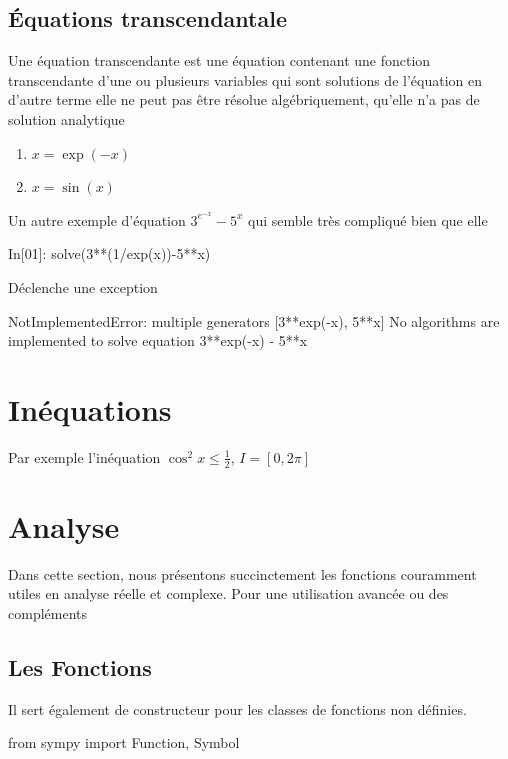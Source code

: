 \subsection{Équations transcendantale}
\begin{definition}
Une équation transcendante est une équation contenant une fonction transcendante d'une ou plusieurs variables 
qui sont solutions de l'équation en d'autre terme elle ne peut pas être résolue algébriquement, qu'elle n'a pas 
de solution analytique
\end{definition}
\begin{example}
 \begin{enumerate}
  \item $x = \exp(-x)$
  \item $x = \sin(x)$
 \end{enumerate}
\end{example}

Un autre exemple d'équation $3^{e^{- x}}- 5^{x}$ qui semble très compliqué  bien que elle 
\begin{python}
In[01]: solve(3**(1/exp(x))-5**x)
\end{python}
Déclenche une exception 
\begin{python}
NotImplementedError: multiple generators [3**exp(-x), 5**x]
No algorithms are implemented to solve equation 3**exp(-x) - 5**x
\end{python}


\section{In\'equations}
Par exemple l'inéquation $\cos^{2}x \leq \frac{1}{2}$, $I = \left[0, 2\pi\right]$
\section{Analyse}
Dans cette section, nous présentons succinctement les fonctions couramment utiles en analyse réelle et complexe. 
Pour une utilisation avancée ou des compléments
 \subsection{Les Fonctions}
Il sert également de constructeur pour les classes de fonctions non définies.

\begin{python}
from sympy import Function, Symbol
\end{python}


